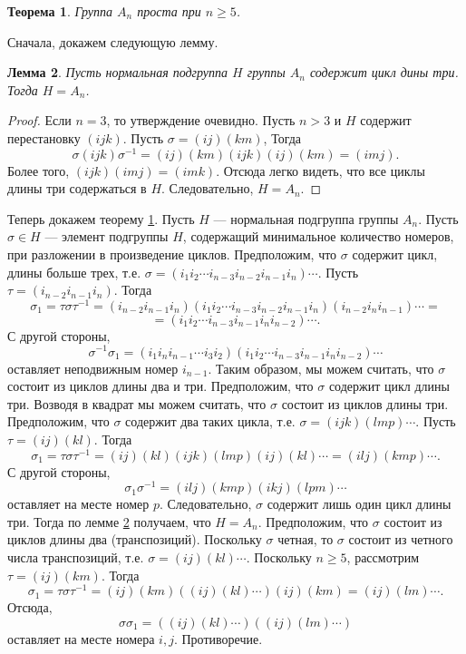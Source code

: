 \documentclass[12pt, titlepage, oneside]{amsbook}
\newtheorem{theorem}{Теорема}[chapter]
\newtheorem{lemma}[theorem]{Лемма}
\theoremstyle{definition}
\theoremstyle{remark}
\begin{document}
\begin{theorem}
\label{Pr4} Группа $A_n$ проста при $n\geq 5$.
\end{theorem}

Сначала, докажем следующую лемму.

\begin{lemma}
\label{PrL}
Пусть нормальная подгруппа $H$ группы $A_n$ содержит цикл дины три. Тогда $H=A_n$.
\end{lemma}

\begin{proof}
Если $n=3$, то утверждение очевидно. Пусть $n>3$ и $H$ содержит перестановку $(ijk)$. Пусть $\sigma=(ij)(km)$, Тогда $$\sigma(ijk)\sigma^{-1}=(ij)(km)(ijk)(ij)(km)=(imj).$$ Более того, $(ijk)(imj)=(imk)$. Отсюда легко видеть, что все циклы длины три содержаться в $H$. Следовательно, $H=A_n$.
\end{proof}

Теперь докажем теорему \ref{Pr4}. Пусть $H$ --- нормальная подгруппа группы $A_n$. Пусть $\sigma\in H$ --- элемент подгруппы $H$, содержащий минимальное количество номеров, при разложении в произведение циклов. Предположим, что $\sigma$ содержит цикл, длины больше трех, т.е. $\sigma=(i_1i_2\cdots i_{n-3}i_{n-2}i_{n-1}i_{n})\cdots$. Пусть $\tau=(i_{n-2}i_{n-1}i_{n})$. Тогда $$\sigma_1=\tau\sigma\tau^{-1}=(i_{n-2}i_{n-1}i_{n})(i_1i_2\cdots i_{n-3}i_{n-2}i_{n-1}i_{n})(i_{n-2}i_{n}i_{n-1})\cdots=$$ $$=(i_1i_2\cdots i_{n-3}i_{n-1}i_{n}i_{n-2})\cdots.$$ С другой стороны, $$\sigma^{-1}\sigma_1=(i_1i_ni_{n-1}\cdots i_3i_2)(i_1i_2\cdots i_{n-3}i_{n-1}i_{n}i_{n-2})\cdots$$ оставляет неподвижным номер $i_{n-1}$. Таким образом, мы можем считать, что $\sigma$ состоит из циклов длины два и три. Предположим, что $\sigma$ содержит цикл длины три. Возводя в квадрат мы можем считать, что $\sigma$ состоит из циклов длины три. Предположим, что $\sigma$ содержит два таких цикла, т.е. $\sigma=(ijk)(lmp)\cdots$. Пусть $\tau=(ij)(kl)$. Тогда $$\sigma_1=\tau\sigma\tau^{-1}=(ij)(kl)(ijk)(lmp)(ij)(kl)\cdots=(ilj)(kmp)\cdots.$$ С другой стороны, $$\sigma_1\sigma^{-1}=(ilj)(kmp)(ikj)(lpm)\cdots$$ оставляет на месте номер $p$. Следовательно, $\sigma$ содержит лишь один цикл длины три. Тогда по лемме \ref{PrL} получаем, что $H=A_n$. Предположим, что $\sigma$ состоит из циклов длины два (транспозиций). Поскольку $\sigma$ четная, то $\sigma$ состоит из четного числа транспозиций, т.е. $\sigma=(ij)(kl)\cdots$. Поскольку $n\geq 5$, рассмотрим $\tau=(ij)(km)$. Тогда $$\sigma_1=\tau\sigma\tau^{-1}=(ij)(km)((ij)(kl)\cdots)(ij)(km)=(ij)(lm)\cdots.$$ Отсюда, $$\sigma \sigma_1=((ij)(kl)\cdots)((ij)(lm)\cdots)$$ оставляет на месте номера $i,j$. Противоречие.
\end{document}
